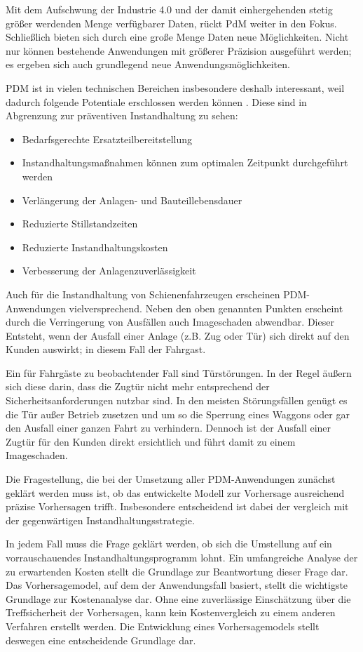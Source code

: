Mit dem Aufschwung der Industrie 4.0 und der damit einhergehenden stetig größer werdenden Menge verfügbarer Daten, rückt PdM weiter in den Fokus. Schließlich bieten sich durch eine große Menge Daten neue Möglichkeiten. Nicht nur können bestehende Anwendungen mit größerer Präzision ausgeführt werden; es ergeben sich auch grundlegend neue Anwendungsmöglichkeiten.

PDM ist in vielen technischen Bereichen insbesondere deshalb interessant, weil  dadurch folgende Potentiale erschlossen werden können \cite[S.~31]{Holzel.2019}. Diese sind in Abgrenzung zur präventiven Instandhaltung zu sehen:
\begin{itemize}
	\item Bedarfsgerechte Ersatzteilbereitstellung
	\item Instandhaltungsmaßnahmen können zum optimalen Zeitpunkt durchgeführt werden
	\item Verlängerung der Anlagen- und Bauteillebensdauer
	\item Reduzierte Stillstandzeiten
	\item Reduzierte Instandhaltungskosten
	\item Verbesserung der Anlagenzuverlässigkeit
\end{itemize}

Auch für die Instandhaltung von Schienenfahrzeugen erscheinen PDM-Anwendungen vielversprechend. Neben den oben genannten Punkten erscheint durch die Verringerung von Ausfällen auch Imageschaden abwendbar. Dieser Entsteht, wenn  der Ausfall einer Anlage (z.B. Zug oder Tür) sich direkt auf den Kunden auswirkt; in diesem Fall der Fahrgast.

Ein für Fahrgäste zu beobachtender Fall sind Türstörungen. In der Regel äußern sich diese darin, dass die Zugtür nicht mehr entsprechend der Sicherheitsanforderungen nutzbar sind. In den meisten Störungsfällen genügt es die Tür außer Betrieb zusetzen und um so die Sperrung eines Waggons oder gar den Ausfall einer ganzen Fahrt zu verhindern. Dennoch ist der Ausfall einer Zugtür für den Kunden direkt ersichtlich und führt damit zu einem Imageschaden.

Die Fragestellung, die bei der Umsetzung aller PDM-Anwendungen zunächst geklärt werden muss ist, ob das entwickelte Modell zur Vorhersage ausreichend präzise Vorhersagen trifft. Insbesondere entscheidend ist dabei der vergleich mit der gegenwärtigen Instandhaltungsstrategie.

In jedem Fall muss die Frage geklärt werden, ob sich die Umstellung auf ein vorrauschauendes Instandhaltungsprogramm lohnt. Ein umfangreiche Analyse der zu erwartenden Kosten stellt die Grundlage zur Beantwortung dieser Frage dar. Das Vorhersagemodel, auf dem der Anwendungsfall basiert, stellt die wichtigste Grundlage zur Kostenanalyse dar. Ohne eine zuverlässige Einschätzung über die Treffsicherheit der Vorhersagen, kann kein Kostenvergleich zu einem anderen Verfahren erstellt werden. Die Entwicklung eines Vorhersagemodels stellt deswegen eine entscheidende Grundlage dar. 
